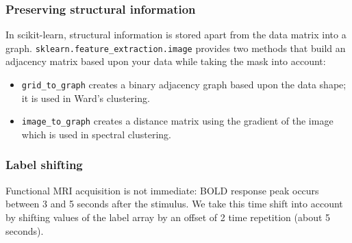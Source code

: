 \documentclass{frontiersSCNS} %
\newcommand{\alex}[1]{\todo[inline, color=green!40]{#1}}
\begin{document}





\subsubsection{Preserving structural information}

In scikit-learn, structural information is stored apart from the data matrix
into a graph. \verb!sklearn.feature_extraction.image! provides two methods
that build an adjacency matrix based upon your data while taking the mask
into account:
\begin{itemize}
    \item \verb!grid_to_graph! creates a binary adjacency graph based upon the
        data shape; it is used in Ward's clustering.
    \item \verb!image_to_graph! creates a distance matrix using the gradient of
        the image which is used in spectral clustering.
\end{itemize}

\subsubsection{Label shifting}

Functional MRI acquisition is not immediate: BOLD response peak occurs between 3
and 5 seconds after the stimulus. We take this time shift into account by
shifting values of the label array by an offset of 2 time repetition (about 5
seconds).

\end{document}
